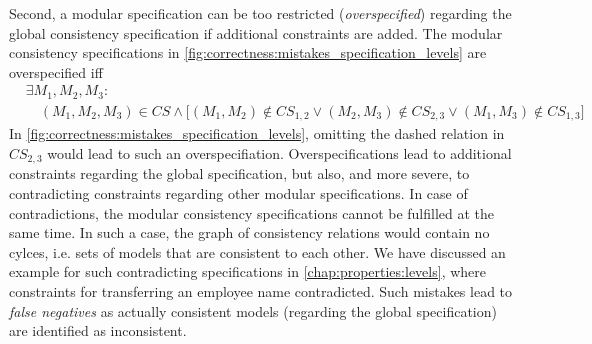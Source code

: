 Second, a modular specification can be too restricted (\emph{overspecified}) regarding the global consistency specification if additional constraints are added. 
The modular consistency specifications in \autoref{fig:correctness:mistakes_specification_levels} are overspecified iff
\begin{align*}
    & \exists M_1, M_2, M_3 : \\
    & \hspace{1em} (M_1, M_2, M_3) \in \mathit{CS} \land \big[ (M_1, M_2) \not\in \mathit{CS}_{1,2} \lor (M_2, M_3) \not\in \mathit{CS}_{2,3} \lor (M_1, M_3) \not\in \mathit{CS}_{1,3} \big]
\end{align*}
In \autoref{fig:correctness:mistakes_specification_levels}, omitting the dashed relation in $\mathit{CS}_{2,3}$ would lead to such an overspecifiation.
Overspecifications lead to additional constraints regarding the global specification, but also, and more severe, to contradicting constraints regarding other modular specifications.
In case of contradictions, the modular consistency specifications cannot be fulfilled at the same time.
In such a case, the graph of consistency relations %
would contain no cylces, i.e. sets of models that are consistent to each other.
We have discussed an example for such contradicting specifications %
in \autoref{chap:properties:levels}, where constraints for transferring an employee name contradicted. %
Such mistakes lead to \emph{false negatives} as actually consistent models (regarding the global specification) are identified as inconsistent. %


